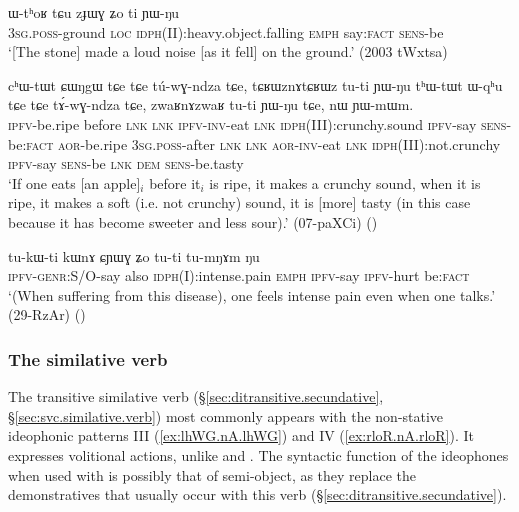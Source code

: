 \begin{exe}
\ex \label{ex:zJWG.Zo}
\gll ɯ-tʰoʁ tɕu zɟɯɣ ʑo ti ɲɯ-ŋu\\
\textsc{3sg}.\textsc{poss}-ground \textsc{loc} \textsc{idph}(II):heavy.object.falling \textsc{emph} say:\textsc{fact} \textsc{sens}-be\\
\glt `[The stone] made a loud noise [as it fell] on the ground.' (2003 tWxtsa)
\end{exe}


\begin{exe}
\ex \label{ex:tCRWz.nA.tCRWz}
\gll cʰɯ-tɯt ɕɯŋgɯ tɕe tɕe tú-wɣ-ndza tɕe, tɕʁɯznɤtɕʁɯz tu-ti ɲɯ-ŋu tʰɯ-tɯt ɯ-qʰu tɕe tɕe tɤ́-wɣ-ndza tɕe, zwaʁnɤzwaʁ tu-ti ɲɯ-ŋu tɕe, nɯ ɲɯ-mɯm. \\
\textsc{ipfv}-be.ripe before \textsc{lnk} \textsc{lnk} \textsc{ipfv}-\textsc{inv}-eat \textsc{lnk} \textsc{idph}(III):crunchy.sound \textsc{ipfv}-say \textsc{sens}-be:\textsc{fact} \textsc{aor}-be.ripe \textsc{3sg}.\textsc{poss}-after \textsc{lnk} \textsc{lnk} \textsc{aor}-\textsc{inv}-eat \textsc{lnk} \textsc{idph}(III):not.crunchy \textsc{ipfv}-say \textsc{sens}-be \textsc{lnk} \textsc{dem} \textsc{sens}-be.tasty \\
\glt `If one eats [an apple]$_i$ before it$_i$ is ripe, it makes a crunchy sound, when it is ripe, it makes a soft (i.e. not crunchy) sound, it is [more] tasty (in this case because it has become sweeter and less sour).' (07-paXCi)
()
\end{exe}

\begin{exe}
\ex \label{ex:CYWG.Zo}
\gll tu-kɯ-ti kɯnɤ ɕɲɯɣ ʑo tu-ti tu-mŋɤm ŋu \\
\textsc{ipfv}-\textsc{genr}:S/O-say also \textsc{idph}(I):intense.pain \textsc{emph} \textsc{ipfv}-say \textsc{ipfv}-hurt be:\textsc{fact} \\
\glt `(When suffering from this disease), one feels intense pain even when one talks.' (29-RzAr)
()
\end{exe}


\subsubsection{The similative verb  } \label{sec:stu.idph} 
The transitive similative verb   (§\ref{sec:ditransitive.secundative}, §\ref{sec:svc.similative.verb}) most commonly appears with the non-stative ideophonic patterns III (\ref{ex:lhWG.nA.lhWG})  and IV (\ref{ex:rloR.nA.rloR}). It expresses volitional actions, unlike  and .  The syntactic function of the ideophones when used with  is possibly that of semi-object, as they replace the demonstratives that usually occur with this verb (§\ref{sec:ditransitive.secundative}).

